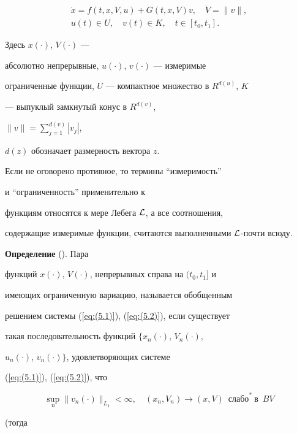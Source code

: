 \begin{gather}


\Dot{x}=f(t,x,V,u)+G(t,x,V)v, \quad


\Dot{V}=\|v\|, \label{eq:(5.1)} \\


u(t) \in U,\quad v(t) \in K,\quad t \in [t_0,t_1].


\label{eq:(5.2)}


\end{gather}


Здесь $x(\cdot)$, $V(\cdot)$ ---


абсолютно непрерывные, $u(\cdot)$, $v(\cdot)$ --- измеримые


ограниченные функции, $U$ --- компактное множество в $R^{d(u)}$, $K$


--- выпуклый замкнутый конус в $R^{d(v)}$,


$\|v\|=\sum\limits_{j=1}^{d(v)}|v_j|$,


$d(z)$ обозначает размерность вектора $z$.


Если не оговорено противное, то термины ``измеримость''


и ``ограниченность'' применительно к


функциям относятся к мере Лебега ${\cal L}$, а все соотношения,


содержащие измеримые функции, считаются выполненными ${\cal L}$-почти всюду.


\medskip





{\bf Определение} (\cite{80}). Пара


функций $x(\cdot)$, $V(\cdot)$, непрерывных справа на $(t_0,t_1]$ и


имеющих ограниченную вариацию, называется обобщeнным


решением системы (\ref{eq:(5.1)}), (\ref{eq:(5.2)}), если существует


такая последовательность функций $\{x_n(\cdot)$, $V_n(\cdot),$


$u_n(\cdot)$, $v_n(\cdot)\}$, удовлетворяющих системе


(\ref{eq:(5.1)}), (\ref{eq:(5.2)}), что


$$


\sup_n\|v_n(\cdot)\|_{L_1} < \infty, \quad (x_n,V_n) \rightarrow


(x,V) \ \; \text{слабо}^{\ast}\ \text{в}\ \; BV


$$


(тогда



